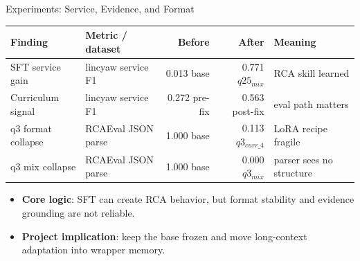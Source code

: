 \begin{frame}{Experiments: Service, Evidence, and Format}
  \scriptsize
  \begin{table}
    \begin{tabular}{p{} p{} r r p{}}
      \toprule
      Finding & Metric / dataset & Before & After & Meaning \\
      \midrule
      SFT service gain & lincyaw service F1 & 0.013 base & 0.771 $q25_{mix}$ & RCA skill learned \\
      Curriculum signal & lincyaw service F1 & 0.272 pre-fix & 0.563 post-fix & eval path matters \\
      q3 format collapse & RCAEval JSON parse & 1.000 base & 0.113 $q3_{curr\_4}$ & LoRA recipe fragile \\
      q3 mix collapse & RCAEval JSON parse & 1.000 base & 0.000 $q3_{mix}$ & parser sees no structure \\
      \bottomrule
    \end{tabular}
  \end{table}
  \begin{itemize}
    \item \textbf{Core logic}: SFT can create RCA behavior, but format stability and evidence grounding are not reliable.
    \item \textbf{Project implication}: keep the base frozen and move long-context adaptation into wrapper memory.
  \end{itemize}
\end{frame}

